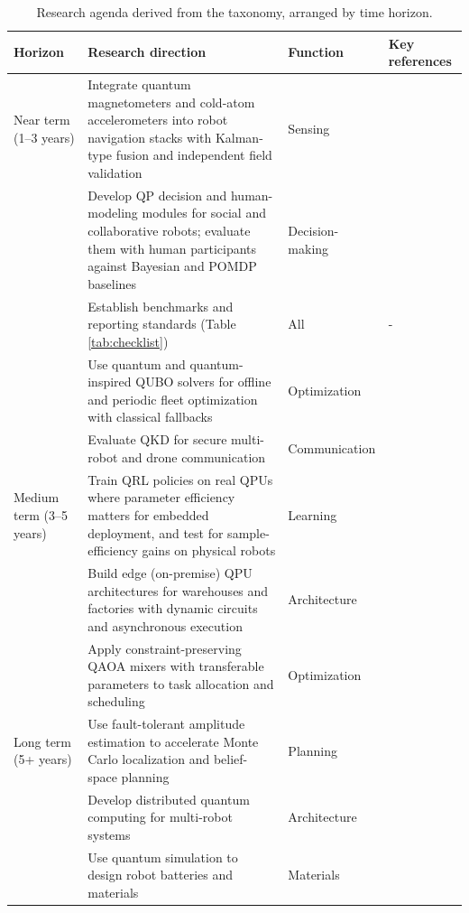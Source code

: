 \documentclass[acmsmall,screen,review]{acmart}
\begin{document}
\begin{table}[p]
\caption{Research agenda derived from the taxonomy, arranged by time horizon.}
\label{tab:roadmap}
\footnotesize
\begin{tabular}{@{}>{\raggedright\arraybackslash}p{0.130\dimexpr\linewidth-8\tabcolsep\relax}>{\raggedright\arraybackslash}p{0.500\dimexpr\linewidth-8\tabcolsep\relax}>{\raggedright\arraybackslash}p{0.150\dimexpr\linewidth-8\tabcolsep\relax}>{\raggedright\arraybackslash}p{0.220\dimexpr\linewidth-8\tabcolsep\relax}@{}}
\toprule
\textbf{Horizon} & \textbf{Research direction} & \textbf{Function} & \textbf{Key references} \\ \midrule
Near term (1--3 years) & Integrate quantum magnetometers and cold-atom accelerometers into robot navigation stacks with Kalman-type fusion and independent field validation & Sensing & \cite{Muradoglu2025,Cheiney2018} \\
 & Develop QP decision and human-modeling modules for social and collaborative robots; evaluate them with human participants against Bayesian and POMDP baselines & Decision-making & \cite{Pothos2022,Kurniawati2022} \\
 & Establish benchmarks and reporting standards (Table \ref{tab:checklist}) & All & - \\
 & Use quantum and quantum-inspired QUBO solvers for offline and periodic fleet optimization with classical fallbacks & Optimization & \cite{Quang2025,Gerlach2025,Goto2019} \\
 & Evaluate QKD for secure multi-robot and drone communication & Communication & \cite{Conrad2025} \\
Medium term (3--5 years) & Train QRL policies on real QPUs where parameter efficiency matters for embedded deployment, and test for sample-efficiency gains on physical robots & Learning & \cite{Hohenfeld2024,Kober2013} \\
 & Build edge (on-premise) QPU architectures for warehouses and factories with dynamic circuits and asynchronous execution & Architecture & \cite{Corcoles2021} \\
 & Apply constraint-preserving QAOA mixers with transferable parameters to task allocation and scheduling & Optimization & \cite{Hadfield2019,Zhou2020} \\
Long term (5+ years) & Use fault-tolerant amplitude estimation to accelerate Monte Carlo localization and belief-space planning & Planning & \cite{Montanaro2015} \\
 & Develop distributed quantum computing for multi-robot systems & Architecture & \cite{Tang2021,Yun2022} \\
 & Use quantum simulation to design robot batteries and materials & Materials & \cite{Kim2022,Rice2021} \\
\bottomrule
\end{tabular}
\end{table}
\end{document}
